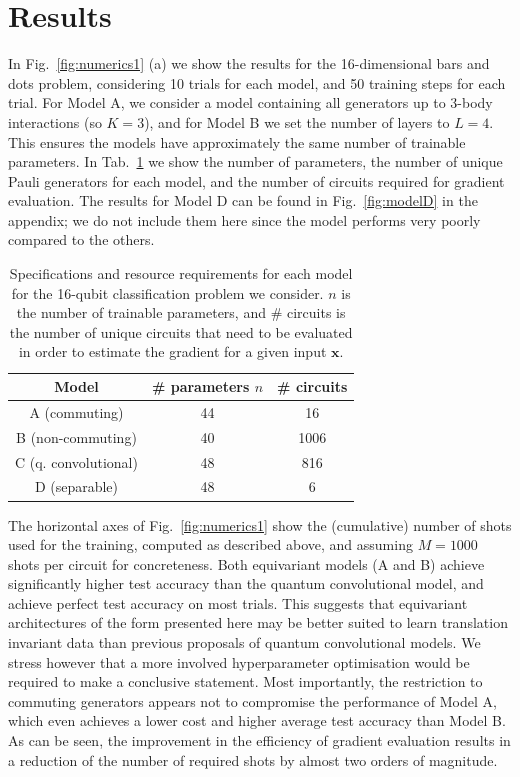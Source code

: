 \documentclass[twocolumn]{revtex4-2}
\renewcommand{\vec}{\boldsymbol}
\begin{document}
\section{Results}

In Fig.\ \ref{fig:numerics1} (a) we show the results for the 16-dimensional bars and dots problem, considering 10 trials for each model, and 50 training steps for each trial. For Model A, we consider a model containing all generators up to $3$-body interactions (so $K=3$), and for Model B we set the number of layers to $L=4$. This ensures the models have approximately the same number of trainable parameters. In Tab.\ \ref{tab:model_specs} we show the number of parameters, the number of unique Pauli generators for each model, and the number of circuits required for gradient evaluation. The results for Model D can be found in Fig.\ \ref{fig:modelD} in the appendix; we do not include them here since the model performs very poorly compared to the others. 


\begin{table}
\begin{center}
\begin{tabular}{ |c|c|c| } 
\hline
Model & \# parameters $n$ & \# circuits \\
\hline
A (commuting) & 44 & 16 \\ 
B (non-commuting) & 40 & 1006 \\
C (q. convolutional) & 48 & 816 \\
D (separable) & 48 & 6 \\
\hline
\end{tabular}
\end{center}
\caption{Specifications and resource requirements for each model for the 16-qubit classification problem we consider. $n$ is the number of trainable parameters, and \# circuits is the number of unique circuits that need to be evaluated in order to estimate the gradient for a given input $\vec{x}$.}  \label{tab:model_specs}
\end{table}

The horizontal axes of Fig.\ \ref{fig:numerics1} show the (cumulative) number of shots used for the training, computed as described above, and assuming $M=1000$ shots per circuit for concreteness. Both equivariant models (A and B) achieve significantly higher test accuracy than the quantum convolutional model, and achieve perfect test accuracy on most trials. This suggests that equivariant architectures of the form presented here may be better suited to learn translation invariant data than previous proposals of quantum convolutional models. We stress however that a more involved hyperparameter optimisation would be required to make a conclusive statement. Most importantly, the restriction to commuting generators appears not to compromise the performance of Model A, which even achieves a lower cost and higher average test accuracy than Model B. As can be seen, the improvement in the efficiency of gradient evaluation results in a reduction of the number of required shots by almost two orders of magnitude. 
\end{document}
